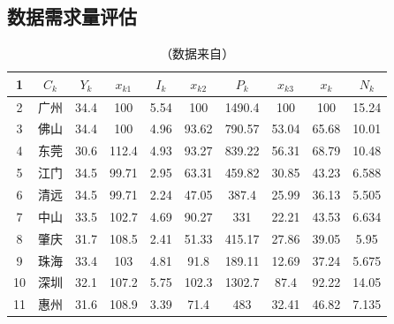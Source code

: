 \documentclass[UTF8,12pt]{ctexart}
\begin{document}
\begin{thebibliography}{20}
\end{thebibliography}



\begin{appendices}
    \section{数据需求量评估}\label{fuluCSSJ}
      \begin{table}[H]
        \centering
        \caption*{\small{（数据来自\cite{CSSJ}）}}
          \begin{tabular}{cccccccccc}
          \toprule
          1      & $C_k$ & $Y_k$ & $x_{k1}$ & $I_k$ & $x_{k2}$ & $P_k$ & $x_{k3}$ & $x_k$ & $N_k$ \\
          \midrule
          2      & 广州     & 34.4   & 100    & 5.54   & 100    & 1490.4 & 100    & 100    & 15.24 \\
          \midrule
          3      & 佛山     & 34.4   & 100    & 4.96   & 93.62  & 790.57 & 53.04  & 65.68  & 10.01 \\
          \midrule
          4      & 东莞     & 30.6   & 112.4  & 4.93   & 93.27  & 839.22 & 56.31  & 68.79  & 10.48 \\
          \midrule
          5      & 江门     & 34.5   & 99.71  & 2.95   & 63.31  & 459.82 & 30.85  & 43.23  & 6.588 \\
          \midrule
          6      & 清远     & 34.5   & 99.71  & 2.24   & 47.05  & 387.4  & 25.99  & 36.13  & 5.505 \\
          \midrule
          7      & 中山     & 33.5   & 102.7  & 4.69   & 90.27  & 331    & 22.21  & 43.53  & 6.634 \\
          \midrule
          8      & 肇庆     & 31.7   & 108.5  & 2.41   & 51.33  & 415.17 & 27.86  & 39.05  & 5.95 \\
          \midrule
          9      & 珠海     & 33.4   & 103    & 4.81   & 91.8   & 189.11 & 12.69  & 37.24  & 5.675 \\
          \midrule
          10     & 深圳     & 32.1   & 107.2  & 5.75   & 102.3  & 1302.7 & 87.4   & 92.22  & 14.05 \\
          \midrule
          11     & 惠州     & 31.6   & 108.9  & 3.39   & 71.4   & 483    & 32.41  & 46.82  & 7.135 \\

\end{tabular}
\end{table}
\end{appendices}
\end{document}
